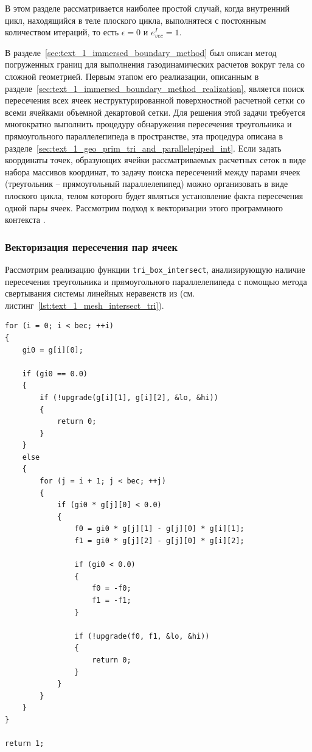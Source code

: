 В этом разделе рассматривается наиболее простой случай, когда внутренний цикл, находящийся в теле плоского цикла, выполнятеся с постоянным количеством итераций, то есть $\epsilon = 0$ и $e_{vec}^I = 1$.

В разделе~\ref{sec:text_1_immersed_boundary_method} был описан метод погруженных границ для выполнения газодинамических расчетов вокруг тела со сложной геометрией.
Первым этапом его реалиазации, описанным в разделе~\ref{sec:text_1_immersed_boundary_method_realization}, является поиск пересечения всех ячеек неструктурированной поверхностной расчетной сетки со всеми ячейками объемной декартовой сетки.
Для решения этой задачи требуется многократно выполнить процедуру обнаружения пересечения треугольника и прямоугольного параллелепипеда в пространстве, эта процедура описана в разделе~\ref{sec:text_1_geo_prim_tri_and_parallelepiped_int}.
Если задать координаты точек, образующих ячейки рассматриваемых расчетных сеток в виде набора массивов координат, то задачу поиска пересечений между парами ячеек (треугольник -- прямоугольный параллелепипед) можно организовать в виде плоского цикла, телом которого будет являться установление факта пересечения одной пары ячеек.
Рассмотрим подход к векторизации этого программного контекста \cite{Rybakov2019VecInt}.

\subsubsection{Векторизация пересечения пар ячеек}

Рассмотрим реализацию функции \texttt{tri\_box\_intersect}, анализирующую наличие пересечения треугольника и прямоугольного параллелепипеда с помощью метода свертывания системы линейных неравенств\label{term:method_svert_sys_neravenstv2} из \cite{Chernikov1963} (см. листинг~\ref{lst:text_1_mesh_intersect_tri}).

\begin{singlespace}
\begin{lstlisting}[caption={Исходная реализация свертывания системы линейных неравенств для определения пересечения треугольника и прямоугольного параллелепипеда.},label={lst:text_1_mesh_intersect_tri}]
for (i = 0; i < bec; ++i)
{
    gi0 = g[i][0];

    if (gi0 == 0.0)
    {
        if (!upgrade(g[i][1], g[i][2], &lo, &hi))
        {
            return 0;
        }
    }
    else
    {
        for (j = i + 1; j < bec; ++j)
        {
            if (gi0 * g[j][0] < 0.0)
            {
                f0 = gi0 * g[j][1] - g[j][0] * g[i][1];
                f1 = gi0 * g[j][2] - g[j][0] * g[i][2];

                if (gi0 < 0.0)
                {
                    f0 = -f0;
                    f1 = -f1;
                }

                if (!upgrade(f0, f1, &lo, &hi))
                {
                    return 0;
                }
            }
        }
    }
}

return 1;
\end{lstlisting}
\end{singlespace}

